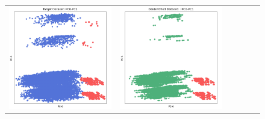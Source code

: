 \begin{figure}[p!]
\begin{tabular}{@{} M{0.166\textwidth} M{0.166\textwidth} | M{0.166\textwidth} M{0.166\textwidth} | M{0.166\textwidth} M{0.166\textwidth} @{}}
       \includegraphics[width=\linewidth]{z_K6-Anon.orig.png} &
       \includegraphics[width=\linewidth]{z_K6-Anon.syn.png} &

\end{tabular}
\end{figure}
